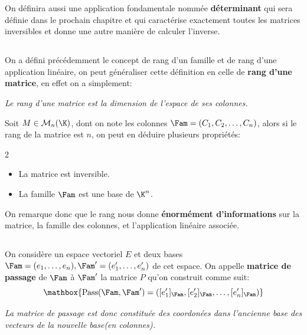 On définira aussi une application fondamentale nommée \textbf{déterminant} qui sera définie dans le prochain chapitre et qui caractérise exactement toutes les matrices inversibles et donne une autre manière de calculer l'inverse.

\subsection*{}

On a défini précédemment le concept de rang d'un famille et de rang d'une application linéaire, on peut généraliser cette définition en celle de \textbf{rang d'une matrice}, en effet on a simplement:
\begin{center}
   \textit{Le rang d'une matrice est la dimension de l'espace de ses colonnes.}
\end{center}

Soit \(M \in \mathcal{M}_n(\K)\), dont on note les colonnes \(\Fam = (C_1, C_2, \ldots, C_n)\), alors si le rang de la matrice est \(n\), on peut en déduire plusieurs propriétés:
\begin{multicols}{2}
   \begin{itemize}
      \item La matrice est inversible.
      \item La famille \(\Fam\) est une base de \(\K^n\).
   \end{itemize}
\end{multicols}
On remarque donc que le rang nous donne \textbf{énormément d'informations} sur la matrice, la famille des colonnes, et l'application linéaire associée.

\subsection*{}

On considère un espace vectoriel \(E\) et deux bases \(\Fam=(e_1, \ldots, e_n), \Fam'=({e}_1', \ldots, {e}_n')\) de cet espace.\+
On appelle \textbf{matrice de passage} de \(\Fam\) à \(\Fam'\) la matrice \(P\) qu'on construit comme suit:
\[
   \mathbox{\text{Pass}(\Fam, \Fam') = ([e_1']_{\Fam}, [e_2']_{\Fam}, \ldots, [e_n']_{\Fam})}
\]
\begin{center}
   \textit{
      La matrice de passage est donc constituée des coordonées dans l'ancienne base des vecteurs de la nouvelle base(en colonnes).
   }
\end{center}

